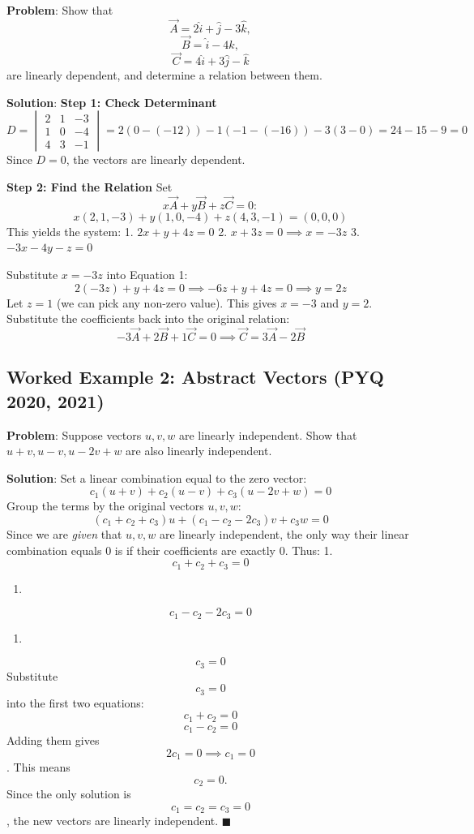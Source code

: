 \documentclass[
]{article}
\providecommand{\tightlist}{%
  \setlength{\itemsep}{0pt}\setlength{\parskip}{0pt}}
\begin{document}
\textbf{Problem}: Show that
\[
\vec{A} = 2\hat{i} + \hat{j} - 3\hat{k},
\]
\[
\vec{B} = \hat{i} - 4\hat{k},
\]
\[
\vec{C} = 4\hat{i} + 3\hat{j} - \hat{k}
\]
are linearly dependent, and determine a relation between them.

\textbf{Solution}: \textbf{Step 1: Check Determinant}
\[
D =
\begin{vmatrix}
2 & 1 & -3 \\
1 & 0 & -4 \\
4 & 3 & -1
\end{vmatrix} = 2(0 - (-12)) - 1(-1 - (-16)) - 3(3 - 0) = 24 - 15 - 9 = 0
\]
Since \(D = 0\), the vectors are linearly dependent.

\textbf{Step 2: Find the Relation} Set
\[
x\vec{A} + y\vec{B} + z\vec{C} = 0:
\]
\[
x(2, 1, -3) + y(1, 0, -4) + z(4, 3, -1) = (0,0,0)
\]
This yields the system: 1. \(2x + y + 4z = 0\) 2.
\(x + 3z = 0 \implies x = -3z\) 3. \(-3x - 4y - z = 0\)

Substitute \(x = -3z\) into Equation 1:
\[
2(-3z) + y + 4z = 0 \implies -6z + y + 4z = 0 \implies y = 2z
\]
Let \(z = 1\) (we can pick any non-zero value). This gives \(x = -3\)
and \(y = 2\). Substitute the coefficients back into the original
relation:
\[
-3\vec{A} + 2\vec{B} + 1\vec{C} = 0 \implies \vec{C} = 3\vec{A} - 2\vec{B}
\]

\subsection{Worked Example 2: Abstract Vectors (PYQ 2020,
2021)}\label{worked-example-2-abstract-vectors-pyq-2020-2021}

\textbf{Problem}: Suppose vectors \(u, v, w\) are linearly independent.
Show that \(u + v, u - v, u - 2v + w\) are also linearly independent.

\textbf{Solution}: Set a linear combination equal to the zero vector:
\[
c_1(u + v) + c_2(u - v) + c_3(u - 2v + w) = 0
\]
Group the terms by the original vectors \(u, v, w\):
\[
(c_1 + c_2 + c_3)u + (c_1 - c_2 - 2c_3)v + c_3w = 0
\]
Since we are \emph{given} that \(u, v, w\) are linearly independent, the
only way their linear combination equals 0 is if their coefficients are
exactly 0. Thus: 1.
\[
c_1 + c_2 + c_3 = 0
\]
\begin{enumerate}
\def\labelenumi{\arabic{enumi}.}
\setcounter{enumi}{1}
\tightlist
\item
\end{enumerate}
\[
c_1 - c_2 - 2c_3 = 0
\]
\begin{enumerate}
\def\labelenumi{\arabic{enumi}.}
\setcounter{enumi}{2}
\tightlist
\item
\end{enumerate}
\[
c_3 = 0
\]
Substitute
\[
c_3 = 0
\]
into the first two equations:
\[
c_1 + c_2 = 0
\]
\[
c_1 - c_2 = 0
\]
Adding them gives
\[
2c_1 = 0 \implies c_1 = 0
\]
. This means
\[
c_2 = 0.
\]
Since the only solution is
\[
c_1 = c_2 = c_3 = 0
\]
, the new vectors are linearly independent. \(\blacksquare\)
\end{document}
